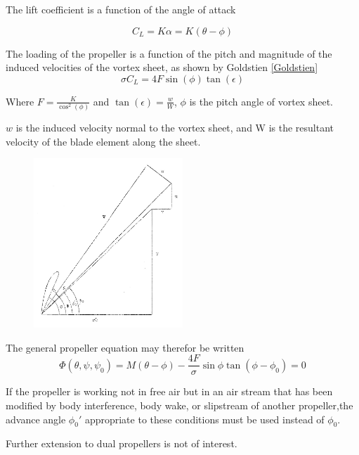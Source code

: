 \documentclass{article}
\begin{document}
The lift coefficient is a function of the angle of attack

\begin{equation}
    C_L = K\alpha = K(\theta - \phi)
\end{equation}

The loading of the propeller is a function of the pitch and magnitude of the induced velocities of the vortex sheet, as shown by Goldstien \ref{Goldstien}
\begin{equation}
    \sigma C_L = 4F \sin(\phi)\tan(\epsilon)
\end{equation}

Where $ F = \frac{K}{\cos^2(\phi)} $ and $ \tan(\epsilon) = \frac{w}{W} $, $\phi$ is the pitch angle of vortex sheet.

$w$ is the induced velocity normal to the vortex sheet, and W is the resultant velocity of the blade element along the sheet.

\begin{figure}[H]
    \centering
    \includegraphics[width=0.5\textwidth]{irven_vel_diagram.jpg}


\end{figure}


The general propeller equation may therefor be written
\begin{equation}
    \Phi(\theta,\psi,\psi_0) = M(\theta - \phi) - \frac{4F}{\sigma} \sin \phi \tan (\phi - \phi_0) = 0
\end{equation}

If the propeller is working not in free air but in an air stream that has been modified by body interference, body wake, or slipstream of another propeller,the advance angle $\phi_0'$ appropriate to these conditions must be used instead of $\phi_0$.

Further extension to dual propellers is not of interest.
\end{document}
